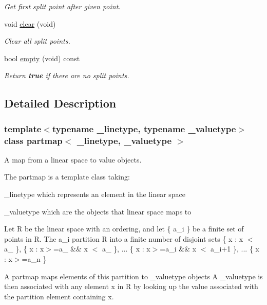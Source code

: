 \begin{DoxyCompactItemize}
\begin{DoxyCompactList}\small\item\em Get first split point after given point. \end{DoxyCompactList}\item 
void \mbox{\hyperlink{classpartmap_a4409658f41f6281f938cb649a1c74c8f}{clear}} (void)
\begin{DoxyCompactList}\small\item\em Clear all split points. \end{DoxyCompactList}\item 
bool \mbox{\hyperlink{classpartmap_acb22171bf61ae4106332972b6fc30791}{empty}} (void) const
\begin{DoxyCompactList}\small\item\em Return {\bfseries{true}} if there are no split points. \end{DoxyCompactList}\end{DoxyCompactItemize}


\subsection{Detailed Description}
\subsubsection*{template$<$typename \+\_\+linetype, typename \+\_\+valuetype$>$\newline
class partmap$<$ \+\_\+linetype, \+\_\+valuetype $>$}

A map from a linear space to value objects. 

The partmap is a template class taking\+:
\begin{DoxyItemize}
\item \+\_\+linetype which represents an element in the linear space
\item \+\_\+valuetype which are the objects that linear space maps to
\end{DoxyItemize}

Let R be the linear space with an ordering, and let \{ a\+\_\+i \} be a finite set of points in R. The a\+\_\+i partition R into a finite number of disjoint sets \{ x \+: x $<$ a\+\_ \}, \{ x \+: x$>$=a\+\_ \&\& x $<$ a\+\_ \}, ... \{ x \+: x$>$=a\+\_\+i \&\& x $<$ a\+\_\+i+1 \}, ... \{ x \+: x$>$=a\+\_\+n \}

A partmap maps elements of this partition to \+\_\+valuetype objects A \+\_\+valuetype is then associated with any element x in R by looking up the value associated with the partition element containing x.

